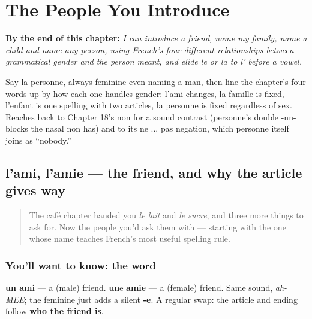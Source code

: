 
\chapter{The People You Introduce}
\label{ch:fr-the-people-you-introduce}

\begin{chapteropening}
\textbf{By the end of this chapter:} \emph{I can introduce a friend, name my family, name a child and name any person, using French's four different relationships between grammatical gender and the person meant, and elide le or la to l' before a vowel.}

Say la personne, always feminine even naming a man, then line the chapter's four words up by how each one handles gender: l'ami changes, la famille is fixed, l'enfant is one spelling with two articles, la personne is fixed regardless of sex. Reaches back to Chapter 18's non for a sound contrast (personne's double -nn- blocks the nasal non has) and to its ne ... pas negation, which personne itself joins as \textquotedblleft{}nobody.\textquotedblright{}
\end{chapteropening}

\section[l'ami, l'amie]{l'ami, l'amie — the friend, and why the article gives way}

\label{lesson:FR-C29-ami}



\begin{quote}
The café chapter handed you \emph{le lait} and \emph{le sucre}, and three more things to ask for. Now the people you'd ask them with — starting with the one whose name teaches French's most useful spelling rule.
\end{quote}

\subsection*{You'll want to know: the word}
\textbf{un ami} — a (male) friend. \textbf{un}e \textbf{amie} — a (female) friend. Same sound, \emph{ah-MEE}; the feminine just adds a silent \textbf{-e}. A regular swap: the article and ending follow \textbf{who the friend is}.

